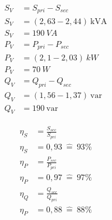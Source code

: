 \begin{enumerate}[label=\alph*)]
	      \begin{minipage}[r]{0.5\linewidth}
		      \begin{align*}
			      S_{V} & = S_{pri} - S_{sec}       \\
			      S_{V} & = (2,63-2,44)\ \text{kVA} \\
			      S_{V} & = 190\ VA                 \\
			      P_{V} & = P_{pri} - P_{sec}       \\
			      P_{V} & = (2,1-2,03)\ kW          \\
			      P_{V} & = 70\ W                   \\
			      Q_{V} & = Q_{pri} - Q_{sec}       \\
			      Q_{V} & = (1,56-1,37)\ \text{var} \\
			      Q_{V} & = 190\ \text{var}
		      \end{align*}
	      \end{minipage}
	      \begin{minipage}[l]{0.5\linewidth}
		      \begin{align*}
			      \eta_S & = \frac{S_{sec}}{S_{pri}} \\
			      \eta_S & = 0,93\ \widehat{=}\ 93\% \\
			      \eta_P & = \frac{P_{sec}}{P_{pri}} \\
			      \eta_P & = 0,97\ \widehat{=}\ 97\% \\
			      \eta_Q & = \frac{Q_{sec}}{Q_{pri}} \\
			      \eta_P & = 0,88\ \widehat{=}\ 88\% \\
		      \end{align*}
	      \end{minipage}
	      \pagebreak


\end{enumerate}
